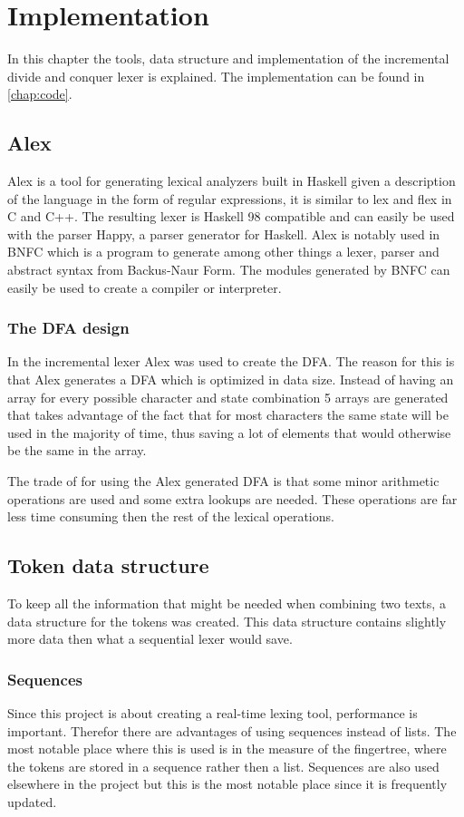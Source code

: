 \chapter{Implementation}
In this chapter the tools, data structure and implementation of the incremental
divide and conquer lexer is explained. The implementation can be found in
\cref{chap:code}.

\section{Alex}
Alex is a tool for generating lexical analyzers built in Haskell given a
description of the language in the form of regular expressions, it is similar to
lex and flex in C and C++. The resulting lexer is Haskell 98 compatible and can
easily be used with the parser Happy, a parser generator for Haskell\cite{alex}.
Alex is notably used in BNFC which is a program to generate among other things a
lexer, parser and abstract syntax from Backus-Naur Form. The modules generated
by BNFC can easily be used to create a compiler or interpreter\cite{bnfc}.

\subsection{The DFA design}
In the incremental lexer Alex was used to create the DFA. The reason for this is
that Alex generates a DFA which is optimized in data size. Instead of having an
array for every possible character and state combination 5 arrays are generated
that takes advantage of the fact that for most characters the same state will be
used in the majority of time, thus saving a lot of elements that would
otherwise be the same in the array.

The trade of for using the Alex generated DFA is that some minor arithmetic
operations are used and some extra lookups are needed. These operations
are far less time consuming then the rest of the lexical operations.

\section{Token data structure}
To keep all the information that might be needed when combining two texts, a data
structure for the tokens was created. This data structure contains slightly more
data then what a sequential lexer would save.

\subsection{Sequences}
Since this project is about creating a real-time lexing tool, performance is
important. Therefor there are advantages of using sequences instead of lists.
The most notable place where this is used is in the measure of the fingertree,
where the tokens are stored in a sequence rather then a list. Sequences are also
used elsewhere in the project but this is the most notable place since it is
frequently updated.

